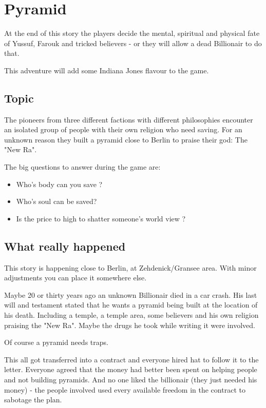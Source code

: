 
\chapter{Pyramid}
\label{ch:adventure pyramid}

At the end of this story the players decide the mental, spiritual and physical fate of Yussuf, Farouk and tricked believers - or they will allow a dead Billionair to do that.

This adventure will add some Indiana Jones flavour to the game.

\section{Topic}

The pioneers from three different factions with different philosophies encounter an isolated group of people with their own religion who need saving. For an unknown reason they built a pyramid close to Berlin to praise their god: The "New Ra".

The big questions to answer during the game are:

\begin{itemize}
    \item Who's body can you save ?
    \item Who's soul can be saved?
    \item Is the price to high to shatter someone's world view ?
\end{itemize}

\section{What really happened}

This story is happening close to Berlin, at Zehdenick/Gransee area. With minor adjustments you can place it somewhere else.

Maybe 20 or thirty years ago an unknown Billionair died in a car crash. His last will and testament stated that he wants a pyramid being built at the location of his death. Including a temple, a temple area, some believers and his own religion praising the "New Ra". Maybe the drugs he took while writing it were involved.

Of course a pyramid needs traps.

This all got transferred into a contract and everyone hired hat to follow it to the letter. Everyone agreed that the money had better been spent on helping people and not building pyramids. And no one liked the billionair (they just needed his money) - the people involved used every available freedom in the contract to sabotage the plan.

